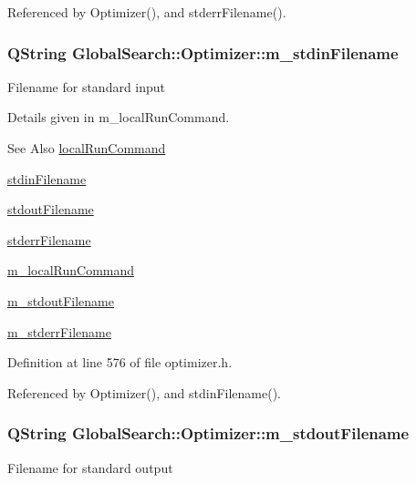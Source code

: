 Referenced by Optimizer(), and stderr\-Filename().

\hypertarget{classGlobalSearch_1_1Optimizer_aca91d12d7aecae052d6ab5ae158acec6}{
\subsubsection[{m\-\_\-stdin\-Filename}]{\setlength{\rightskip}{0pt plus 5cm}Q\-String Global\-Search\-::\-Optimizer\-::m\-\_\-stdin\-Filename\hspace{0.3cm}{\ttfamily [protected]}}}\label{classGlobalSearch_1_1Optimizer_aca91d12d7aecae052d6ab5ae158acec6}
Filename for standard input

Details given in m\-\_\-local\-Run\-Command.

\begin{DoxySeeAlso}{See Also}
\hyperlink{classGlobalSearch_1_1Optimizer_aed5eb285d45a001c9520c2ed3a5b57a1}{local\-Run\-Command} 

\hyperlink{classGlobalSearch_1_1Optimizer_a5964a9b38d3ae90c8ac36a75d3a35832}{stdin\-Filename} 

\hyperlink{classGlobalSearch_1_1Optimizer_a217750aa50431f9948aa8164fb99de0c}{stdout\-Filename} 

\hyperlink{classGlobalSearch_1_1Optimizer_acaa83cc6bf1dcc263b92450b4f8cb652}{stderr\-Filename} 

\hyperlink{classGlobalSearch_1_1Optimizer_a1cdb6b6c5e929e84c834ba93148fb31e}{m\-\_\-local\-Run\-Command} 

\hyperlink{classGlobalSearch_1_1Optimizer_a5ed04fdd5f8b511249e408adcd174550}{m\-\_\-stdout\-Filename} 

\hyperlink{classGlobalSearch_1_1Optimizer_a75b800a7f90a03d551f6795404d0c8f1}{m\-\_\-stderr\-Filename} 
\end{DoxySeeAlso}


Definition at line 576 of file optimizer.\-h.



Referenced by Optimizer(), and stdin\-Filename().

\hypertarget{classGlobalSearch_1_1Optimizer_a5ed04fdd5f8b511249e408adcd174550}{
\subsubsection[{m\-\_\-stdout\-Filename}]{\setlength{\rightskip}{0pt plus 5cm}Q\-String Global\-Search\-::\-Optimizer\-::m\-\_\-stdout\-Filename\hspace{0.3cm}{\ttfamily [protected]}}}\label{classGlobalSearch_1_1Optimizer_a5ed04fdd5f8b511249e408adcd174550}
Filename for standard output

